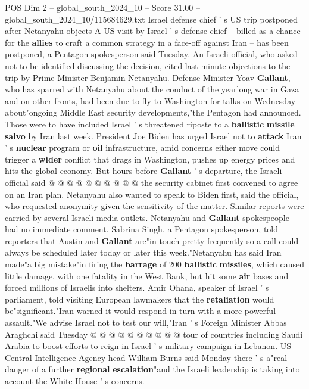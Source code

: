 \begin{textsample}{POS Dim 2 – global\_south\_2024\_10 – Score 31.00 – global\_south\_2024\_10/115684629.txt}  \label{ex:f2_pos_029}
Israel defense chief ' s US trip postponed after Netanyahu objects A US visit by Israel ' s defense chief -- billed as a chance for the \textbf{allies} to craft a common strategy in a face-off against Iran -- has been postponed, a Pentagon spokesperson said Tuesday.
An Israeli official, who asked not to be identified discussing the decision, cited last-minute objections to the trip by Prime Minister Benjamin Netanyahu.
Defense Minister Yoav \textbf{Gallant}, who has sparred with Netanyahu about the conduct of the yearlong war in Gaza and on other fronts, had been due to fly to Washington for talks on Wednesday about"ongoing Middle East security developments,"the Pentagon had announced.
Those were to have included Israel ' s threatened riposte to a \textbf{ballistic} \textbf{missile} \textbf{salvo} by Iran last week.
President Joe Biden has urged Israel not to \textbf{attack} Iran ' s \textbf{nuclear} program or \textbf{oil} infrastructure, amid concerns either move could trigger a \textbf{wider} conflict that drags in Washington, pushes up energy prices and hits the global economy.
But hours before \textbf{Gallant} ' s departure, the Israeli official said @ @ @ @ @ @ @ @ @ @ the security cabinet first convened to agree on an Iran plan.
Netanyahu also wanted to speak to Biden first, said the official, who requested anonymity given the sensitivity of the matter.
Similar reports were carried by several Israeli media outlets.
Netanyahu and \textbf{Gallant} spokespeople had no immediate comment.
Sabrina Singh, a Pentagon spokesperson, told reporters that Austin and \textbf{Gallant} are"in touch pretty frequently so a call could always be scheduled later today or later this week."Netanyahu has said Iran made"a big mistake"in firing the \textbf{barrage} of 200 \textbf{ballistic} \textbf{missiles}, which caused little damage, with one fatality in the West Bank, but hit some \textbf{air} bases and forced millions of Israelis into shelters.
Amir Ohana, speaker of Israel ' s parliament, told visiting European lawmakers that the \textbf{retaliation} would be"significant."Iran warned it would respond in turn with a more powerful assault."We advise Israel not to test our will,"Iran ' s Foreign Minister Abbas Araghchi said Tuesday @ @ @ @ @ @ @ @ @ @ tour of countries including Saudi Arabia to boost efforts to reign in Israel ' s military campaign in Lebanon.
US Central Intelligence Agency head William Burns said Monday there ' s a"real danger of a further \textbf{regional} \textbf{escalation}"and the Israeli leadership is taking into account the White House ' s concerns.

\end{textsample}

